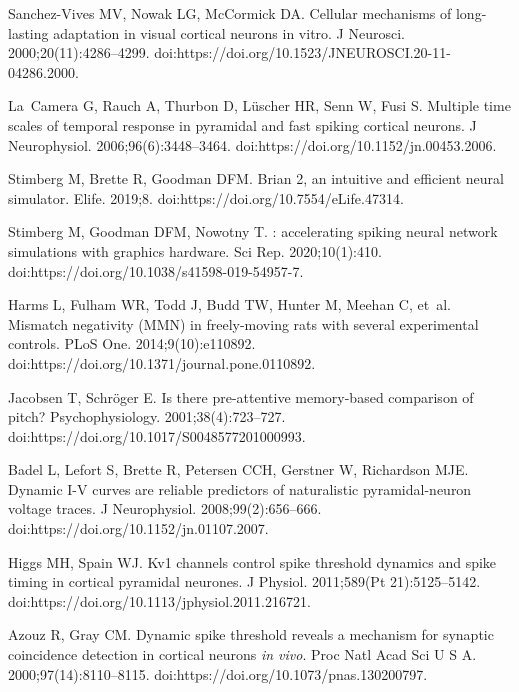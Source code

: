 \documentclass[10pt,letterpaper]{article}
\begin{document}
\begin{thebibliography}{100}
  Sanchez-Vives MV, Nowak LG, McCormick DA.
  \newblock Cellular mechanisms of long-lasting adaptation in visual cortical
    neurons in vitro.
  \newblock J Neurosci. 2000;20(11):4286--4299.
  \newblock doi:{https://doi.org/10.1523/JNEUROSCI.20-11-04286.2000}.
  
  La~Camera G, Rauch A, Thurbon D, L{\"u}scher HR, Senn W, Fusi S.
  \newblock Multiple time scales of temporal response in pyramidal and fast
    spiking cortical neurons.
  \newblock J Neurophysiol. 2006;96(6):3448--3464.
  \newblock doi:{https://doi.org/10.1152/jn.00453.2006}.
  
  Stimberg M, Brette R, Goodman DFM.
  \newblock Brian 2, an intuitive and efficient neural simulator.
  \newblock Elife. 2019;8.
  \newblock doi:{https://doi.org/10.7554/eLife.47314}.
  
  Stimberg M, Goodman DFM, Nowotny T.
  : accelerating spiking neural network simulations with
    graphics hardware.
  \newblock Sci Rep. 2020;10(1):410.
  \newblock doi:{https://doi.org/10.1038/s41598-019-54957-7}.
  
  Harms L, Fulham WR, Todd J, Budd TW, Hunter M, Meehan C, et~al.
  \newblock Mismatch negativity ({MMN}) in freely-moving rats with several
    experimental controls.
  \newblock PLoS One. 2014;9(10):e110892.
  \newblock doi:{https://doi.org/10.1371/journal.pone.0110892}.
  
  Jacobsen T, Schr{\"o}ger E.
  \newblock Is there pre-attentive memory-based comparison of pitch?
  \newblock Psychophysiology. 2001;38(4):723--727.
  \newblock doi:{https://doi.org/10.1017/S0048577201000993}.
  
  Badel L, Lefort S, Brette R, Petersen CCH, Gerstner W, Richardson MJE.
  \newblock Dynamic {I-V} curves are reliable predictors of naturalistic
    pyramidal-neuron voltage traces.
  \newblock J Neurophysiol. 2008;99(2):656--666.
  \newblock doi:{https://doi.org/10.1152/jn.01107.2007}.
  
  Higgs MH, Spain WJ.
  \newblock Kv1 channels control spike threshold dynamics and spike timing in
    cortical pyramidal neurones.
  \newblock J Physiol. 2011;589(Pt 21):5125--5142.
  \newblock doi:{https://doi.org/10.1113/jphysiol.2011.216721}.
  
  Azouz R, Gray CM.
  \newblock Dynamic spike threshold reveals a mechanism for synaptic coincidence
    detection in cortical neurons \textit{in vivo}.
  \newblock Proc Natl Acad Sci U S A. 2000;97(14):8110--8115.
  \newblock doi:{https://doi.org/10.1073/pnas.130200797}.
  

\end{thebibliography}
\end{document}
